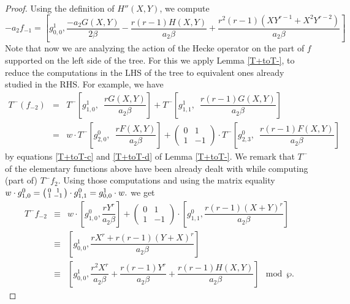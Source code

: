 \documentclass[11pt, reqno]{amsart}
\numberwithin{equation}{section}
\theoremstyle{definition}
\theoremstyle{remark}
\theoremstyle{definition}
\theoremstyle{remark}
\theoremstyle{remark}
\begin{document}
\begin{proof}
Using the definition of $H''(X,Y)$, we compute
\begin{equation}\label{a2f-1}
    -a_2f_{-1}= 
        \left[g_{0,0}^1, \dfrac{-a_2G(X,Y)}{2\beta} - \dfrac{r(r-1)H(X,Y)}{a_{2}\beta}+ \dfrac{r^2(r-1)(XY^{r-1}+X^2Y^{r-2})}{a_2\beta}\right] 
    \end{equation}
Note that now  we are analyzing the action of the Hecke operator on the part of $f$ supported on the left side of the tree. %
For this we apply Lemma \ref{T+toT-}, to reduce the computations in the LHS of the tree to equivalent ones already studied in the RHS. For example, we have
\begin{eqnarray*}
    T^-(f_{-2})&=& T^-\left[g_{1,0}^1,\enspace \dfrac{rG(X,Y)}{a_{2}\beta}\right]+ T^-\left[g_{1,1}^1,\enspace \dfrac{r(r-1)G(X,Y)}{a_2\beta}\right]\\
    &=&  w\cdot T^-\left[g_{2,0}^0,\enspace \dfrac{rF(X,Y)}{a_{2}\beta}\right]+ \begin{pmatrix}
        0 & 1\\
        1 & -1
    \end{pmatrix}\cdot T^-\left[g_{2,3}^{0},\enspace \dfrac{r(r-1)F(X,Y)}{a_2\beta}\right]
   \end{eqnarray*}
by equations \eqref{T+toT-c} and \eqref{T+toT-d} of Lemma \ref{T+toT-}.  We remark that $T^-$ of the elementary functions above have been already dealt with while computing (part of) $T^-f_2$. Using those computations and using the matrix equality $w\cdot g_{1,0}^{0}= 
    \begin{psmallmatrix}
    0 & 1\\
    1 & -1
    \end{psmallmatrix}\cdot g_{1,1}^{0} = g_{0,0}^{1}\cdot w.$  %
    we get
\begin{eqnarray}\label{T-f-2}
    T^{-}f_{-2}&
    \equiv & w\cdot \left[g_{1,0}^{0}, \dfrac{rY^{r}}{a_{2}\beta}\right] + \begin{pmatrix}
        0 & 1\\
        1 & -1
\end{pmatrix}\cdot\left[g_{1,1}^{0}, \dfrac{r(r-1)(X+Y)^r}{a_{2}\beta}\right] \nonumber\\
    &\equiv & \left[g_{0,0}^{1}, \dfrac{rX^{r}+r(r-1)(Y+X)^r}{a_{2}\beta}\right] \nonumber\\
 &\equiv &\left[g_{0,0}^{1}, \dfrac{r^{2}X^{r}}{a_{2}\beta}+ \dfrac{r(r-1)Y^r}{a_2\beta}+ \dfrac{r(r-1)H(X,Y)}{a_{2}\beta}\right] \mod\wp.
\end{eqnarray}

\end{proof}
\end{document}
